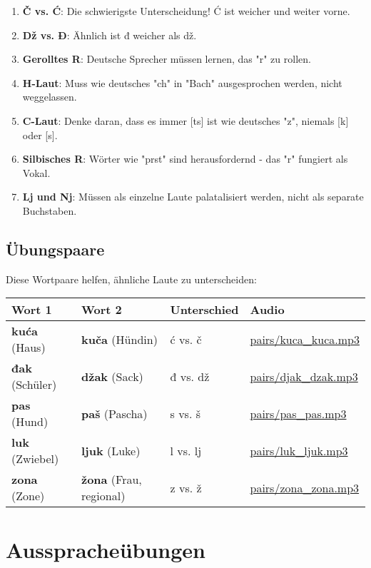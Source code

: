 \begin{enumerate}
    \item \textbf{Č vs. Ć}: Die schwierigste Unterscheidung! Ć ist weicher und weiter vorne.
    \item \textbf{Dž vs. Đ}: Ähnlich ist đ weicher als dž.
    \item \textbf{Gerolltes R}: Deutsche Sprecher müssen lernen, das "r" zu rollen.
    \item \textbf{H-Laut}: Muss wie deutsches "ch" in "Bach" ausgesprochen werden, nicht weggelassen.
    \item \textbf{C-Laut}: Denke daran, dass es immer [ts] ist wie deutsches "z", niemals [k] oder [s].
    \item \textbf{Silbisches R}: Wörter wie "prst" sind herausfordernd - das "r" fungiert als Vokal.
    \item \textbf{Lj und Nj}: Müssen als einzelne Laute palatalisiert werden, nicht als separate Buchstaben.
\end{enumerate}

\subsection{Übungspaare}

Diese Wortpaare helfen, ähnliche Laute zu unterscheiden:

\begin{center}
\begin{tabular}{llll}
\toprule
\textbf{Wort 1} & \textbf{Wort 2} & \textbf{Unterschied} & \textbf{Audio} \\
\midrule
\textbf{kuća} (Haus) & \textbf{kuča} (Hündin) & ć vs. č & \small\url{pairs/kuca\_kuca.mp3} \\
\textbf{đak} (Schüler) & \textbf{džak} (Sack) & đ vs. dž & \small\url{pairs/djak\_dzak.mp3} \\
\textbf{pas} (Hund) & \textbf{paš} (Pascha) & s vs. š & \small\url{pairs/pas\_pas.mp3} \\
\textbf{luk} (Zwiebel) & \textbf{ljuk} (Luke) & l vs. lj & \small\url{pairs/luk\_ljuk.mp3} \\
\textbf{zona} (Zone) & \textbf{žona} (Frau, regional) & z vs. ž & \small\url{pairs/zona\_zona.mp3} \\
\bottomrule
\end{tabular}
\end{center}

\section{Ausspracheübungen}

